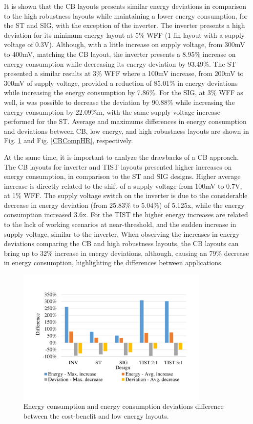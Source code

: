 \documentclass[diss,pgmicro,english]{iiufrgs}
\begin{document}
It is shown that the CB layouts presents similar energy deviations in comparison to the high robustness layouts while maintaining a lower energy consumption, for the ST and SIG, with the exception of the inverter. The inverter presents a high deviation for its minimum energy layout at 5\% WFF (1 fin layout with a supply voltage of 0.3V). Although, with a little increase on supply voltage, from 300mV to 400mV, matching the CB layout, the inverter presents a 8.95\% increase on energy consumption while decreasing its energy deviation by 93.49\%. The ST presented a similar results at 3\% WFF where a 100mV increase, from 200mV to 300mV of supply voltage, provided a reduction of 85.01\% in energy deviations while increasing the energy consumption by 7.86\%. For the SIG, at 3\% WFF as well, is was possible to decrease the deviation by 90.88\% while increasing the energy consumption by 22.09\%m, with the same supply voltage increase performed for the ST. Average and maximums differences in energy consumption and deviations between CB, low energy, and high robustness layouts are shown in Fig. \ref{CBCompLE} and Fig. \ref{CBCompHR}, respectively.

    At the same time, it is important to analyze the drawbacks of a CB approach. The CB layouts for inverter and TIST layouts presented higher increases on energy consumption, in comparison to the ST and SIG designs. Higher average increase is directly related to the shift of a supply voltage from 100mV to 0.7V, at 1\% WFF. The supply voltage switch on the inverter is due to the considerable decrease in energy deviation (from 25.83\% to 5.04\%) of 5.125x, while the energy consumption increased 3.6x. For the TIST the higher energy increases are related to the lack of working scenarios at near-threshold, and the sudden increase in supply voltage, similar to the inverter. When observing the increases in energy deviations comparing the CB and high robustness layouts, the CB layouts can bring up to 32\% increase in energy deviations, although, causing an 79\% decrease in energy consumption, highlighting the differences between applications.

\begin{figure}[t]
	\centering
       	\caption{Energy consumption and energy consumption deviations difference between the cost-benefit and low energy layouts. \label{CBCompLE}}        	  \includegraphics[width=0.85\textwidth, trim={1.25cm 2cm 2cm 3cm}, clip]{compCB-LE.pdf}
\end{figure}
\end{document}
